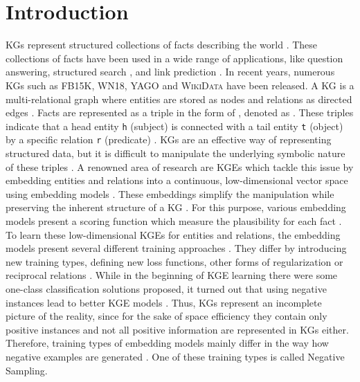 \chapter{Introduction}
\label{ch:introduction}

\acp{KG} represent structured collections of facts describing the world  \cite{hogan2020knowledge}.
These collections of facts have been used in a wide range of applications, like question answering, structured search \cite{zhang2019nscaching}, and link prediction \cite{cai2017kbgan, Alam2020AffinityDN}.
In recent years, numerous \acp{KG} such as \textsc{FB15K}, \textsc{WN18}, \textsc{YAGO} \cite{ConEx} and \textsc{WikiData} \cite{arnaoutwikinegata} have been released.
A \ac{KG} is a multi-relational graph where entities are stored as nodes and relations as directed edges \cite{zhang2019nscaching}.
Facts are represented as a triple in the form of , denoted as  .
These triples indicate that a head entity \texttt{h} (subject) is connected with a tail entity \texttt{t} (object) by a specific relation \texttt{r} (predicate) \cite{zhang2019nscaching, Alam2020AffinityDN}.
\acp{KG} are an effective way of representing structured data, but it is difficult to manipulate the underlying symbolic nature of these triples \cite{8047276}.
A renowned area of research are \acp{KGE} which tackle this issue by embedding entities and relations into a continuous, low-dimensional vector space using embedding models \cite{Alam2020AffinityDN}.
These embeddings simplify the manipulation while preserving the inherent structure of a \ac{KG} \cite{8047276}. 
For this purpose, various embedding models present a scoring function which measure the plausibility for each fact \cite{8047276, ConvE, qiannegative}.
To learn these low-dimensional \acp{KGE} for entities and relations, the embedding models present several different training approaches \cite{Ruffinelli2020You}.
They differ by introducing new training types, defining new loss functions, other forms of regularization or reciprocal relations \cite{Ruffinelli2020You}.
While in the beginning of \ac{KGE} learning there were some one-class classification solutions proposed, it turned out that using negative instances lead to better \ac{KGE} models \cite{kotnis2017analysis}.
Thus, \acp{KG} represent an incomplete picture of the reality, since for the sake of space efficiency they contain only positive instances \cite{qiannegative} and not all positive information are represented in \acp{KG} either.
Therefore, training types of embedding models mainly differ in the way 
how negative examples are generated \cite{Ruffinelli2020You}. 
One of these training types is called Negative Sampling.

